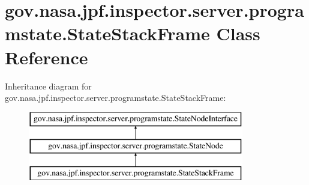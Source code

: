 \hypertarget{classgov_1_1nasa_1_1jpf_1_1inspector_1_1server_1_1programstate_1_1_state_stack_frame}{}\section{gov.\+nasa.\+jpf.\+inspector.\+server.\+programstate.\+State\+Stack\+Frame Class Reference}
\label{classgov_1_1nasa_1_1jpf_1_1inspector_1_1server_1_1programstate_1_1_state_stack_frame}
Inheritance diagram for gov.\+nasa.\+jpf.\+inspector.\+server.\+programstate.\+State\+Stack\+Frame\+:\begin{figure}[H]
\begin{center}
\leavevmode
\includegraphics[height=3.000000cm]{classgov_1_1nasa_1_1jpf_1_1inspector_1_1server_1_1programstate_1_1_state_stack_frame}
\end{center}
\end{figure}
